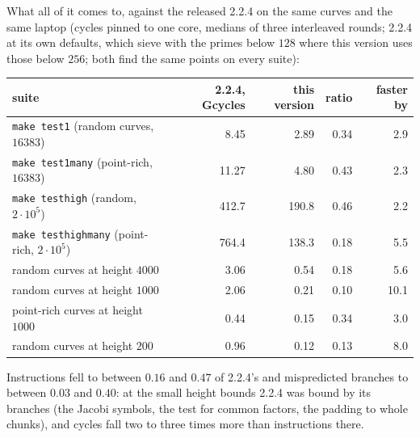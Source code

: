 \documentclass[12pt,a4paper,oneside]{amsart}
\begin{document}
What all of it comes to, against the released 2.2.4 on the same curves and
the same laptop (cycles pinned to one core, medians of three interleaved
rounds; 2.2.4 at its own defaults, which sieve with the primes below $128$
where this version uses those below $256$; both find the same points on every
suite):
\begin{center}
\begin{tabular}{lrrrr}
suite & 2.2.4, Gcycles & this version & ratio & faster by \\
\hline
\texttt{make test1} (random curves, $16383$)      &   8.45 &   2.89 & 0.34 &  2.9 \\
\texttt{make test1many} (point-rich, $16383$)     &  11.27 &   4.80 & 0.43 &  2.3 \\
\texttt{make testhigh} (random, $2\cdot 10^5$)    & 412.7  & 190.8  & 0.46 &  2.2 \\
\texttt{make testhighmany} (point-rich, $2\cdot 10^5$) & 764.4 & 138.3 & 0.18 & 5.5 \\
random curves at height $4000$                  &   3.06 &   0.54 & 0.18 &  5.6 \\
random curves at height $1000$                  &   2.06 &   0.21 & 0.10 & 10.1 \\
point-rich curves at height $1000$              &   0.44 &   0.15 & 0.34 &  3.0 \\
random curves at height $200$                   &   0.96 &   0.12 & 0.13 &  8.0 \\
\end{tabular}
\end{center}
Instructions fell to between $0.16$ and $0.47$ of 2.2.4's and mispredicted
branches to between $0.03$ and $0.40$: at the small height bounds 2.2.4 was
bound by its branches (the Jacobi symbols, the test for common factors, the
padding to whole chunks), and cycles fall two to three times more than
instructions there.
\end{document}
